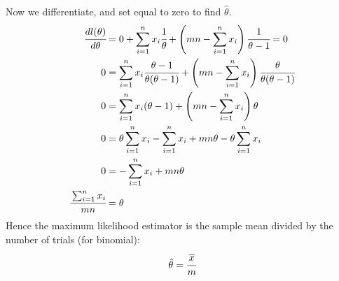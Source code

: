 Now we differentiate, and set equal to zero to find $\hat{\theta}$.
\[\begin{split}
		\cfrac{dl(\theta)}{d\theta} &= 0 + \sum_{i=1}^nx_i\cfrac{1}{\theta} + \left( mn - \sum_{i=1}^n x_i \right)\cfrac{1}{\theta - 1}= 0 \\
		0 & = \sum_{i=1}^nx_i\cfrac{\theta - 1}{\theta(\theta - 1)} + \left( mn - \sum_{i=1}^n x_i \right)\cfrac{\theta}{\theta(\theta - 1)} \\
		0 & = \sum_{i=1}^nx_i (\theta - 1) + \left( mn - \sum_{i=1}^n x_i \right)\theta \\
		0 & = \theta\sum_{i=1}^nx_i - \sum_{i=1}^nx_i + mn\theta - \theta\sum_{i=1}^n x_i  \\
		0 & = - \sum_{i=1}^nx_i + mn\theta  \\
		\cfrac{\sum_{i=1}^nx_i}{mn} & =\theta  \\
	\end{split}\]
Hence the maximum likelihood estimator is the sample mean divided by the number of trials (for binomial):
\[\hat{\theta} = \cfrac{\overline{x}}{m}\]
